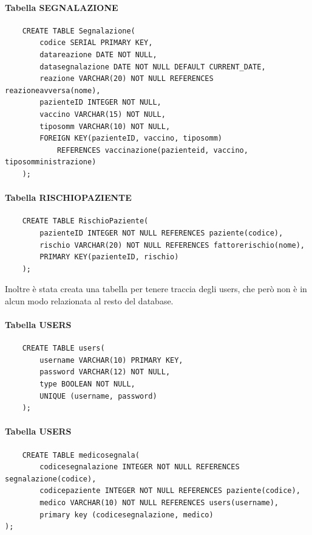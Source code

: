 \documentclass{article}
\begin{document}
\paragraph*{Tabella SEGNALAZIONE}
\begin{verbatim}
    CREATE TABLE Segnalazione(
        codice SERIAL PRIMARY KEY,
        datareazione DATE NOT NULL,
        datasegnalazione DATE NOT NULL DEFAULT CURRENT_DATE,
        reazione VARCHAR(20) NOT NULL REFERENCES reazioneavversa(nome),
        pazienteID INTEGER NOT NULL,
        vaccino VARCHAR(15) NOT NULL,
        tiposomm VARCHAR(10) NOT NULL,
        FOREIGN KEY(pazienteID, vaccino, tiposomm) 
            REFERENCES vaccinazione(pazienteid, vaccino, tiposomministrazione)
    );
\end{verbatim}
\paragraph*{Tabella RISCHIOPAZIENTE}
\begin{verbatim}
    CREATE TABLE RischioPaziente(
        pazienteID INTEGER NOT NULL REFERENCES paziente(codice),
        rischio VARCHAR(20) NOT NULL REFERENCES fattorerischio(nome),
        PRIMARY KEY(pazienteID, rischio)
    );
\end{verbatim}
Inoltre è stata creata una tabella per tenere traccia degli users, che però non è in alcun modo relazionata al resto del database.
\paragraph*{Tabella USERS}
\begin{verbatim}
    CREATE TABLE users(
        username VARCHAR(10) PRIMARY KEY,
        password VARCHAR(12) NOT NULL,
        type BOOLEAN NOT NULL,
        UNIQUE (username, password)
    );
\end{verbatim}

\paragraph*{Tabella USERS}
\begin{verbatim}
    CREATE TABLE medicosegnala(
        codicesegnalazione INTEGER NOT NULL REFERENCES segnalazione(codice),
        codicepaziente INTEGER NOT NULL REFERENCES paziente(codice),
        medico VARCHAR(10) NOT NULL REFERENCES users(username),
        primary key (codicesegnalazione, medico)
);
\end{verbatim}
\end{document}
